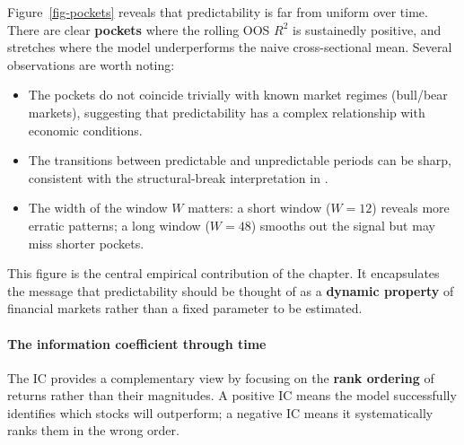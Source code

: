 Figure~\ref{fig-pockets} reveals that predictability is far from uniform over time. There are clear \textbf{pockets} where the rolling OOS $R^2$ is sustainedly positive, and stretches where the model underperforms the naive cross-sectional mean. Several observations are worth noting:

\begin{itemize}
\item The pockets do not coincide trivially with known market regimes (bull/bear markets), suggesting that predictability has a complex relationship with economic conditions.
\item The transitions between predictable and unpredictable periods can be sharp, consistent with the structural-break interpretation in \cite{farmer2019pockets}.
\item The width of the window $W$ matters: a short window ($W=12$) reveals more erratic patterns; a long window ($W=48$) smooths out the signal but may miss shorter pockets.
\end{itemize}

This figure is the central empirical contribution of the chapter. It encapsulates the message that predictability should be thought of as a \textbf{dynamic property} of financial markets rather than a fixed parameter to be estimated.

\paragraph{The information coefficient through time}

The IC provides a complementary view by focusing on the \textbf{rank ordering} of returns rather than their magnitudes. A positive IC means the model successfully identifies which stocks will outperform; a negative IC means it systematically ranks them in the wrong order.

